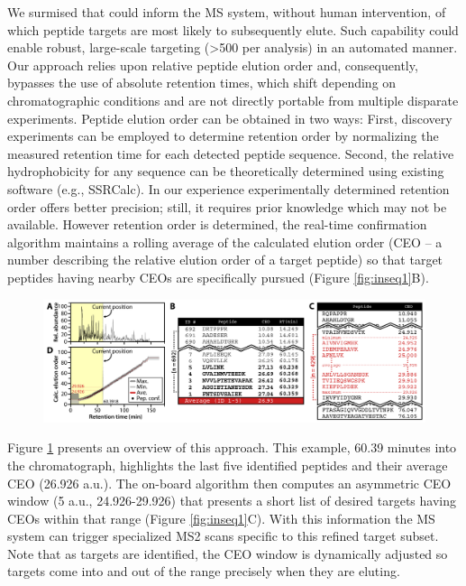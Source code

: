 We surmised that \inseq{} could inform the MS system, without human intervention, of which peptide targets are most likely to subsequently elute. Such capability could enable robust, large-scale targeting (>500 per analysis) in an automated manner. Our approach relies upon relative peptide elution order and, consequently, bypasses the use of absolute retention times, which shift depending on chromatographic conditions and are not directly portable from multiple disparate experiments. Peptide elution order can be obtained in two ways: First, discovery experiments can be employed to determine retention order by normalizing the measured retention time for each detected peptide sequence. Second, the relative hydrophobicity for any sequence can be theoretically determined using existing software (e.g., SSRCalc).\cite{ssrcalc1,ssrcalc2,incselect} In our experience experimentally determined retention order offers better precision; still, it requires prior knowledge which may not be available. However retention order is determined, the real-time confirmation algorithm maintains a rolling average of the calculated elution order (CEO -- a number describing the relative elution order of a target peptide) so that target peptides having nearby CEOs are specifically pursued (Figure \ref{fig:inseq1}B).
\begin{figure}
	\centering
	\includegraphics[width=\columnwidth]{inseq/inSeq_Fig 2.png}
	\label{fig:inseq2}
\end{figure}
Figure \ref{fig:inseq2} presents an overview of this approach. This example, 60.39 minutes into the chromatograph, highlights the last five \inseq{} identified peptides and their average CEO (26.926 a.u.). The on-board algorithm then computes an asymmetric CEO window (5 a.u., 24.926-29.926) that presents a short list of desired targets having CEOs within that range (Figure \ref{fig:inseq1}C). With this information the MS system can trigger specialized MS2 scans specific to this refined target subset. Note that as targets are identified, the CEO window is dynamically adjusted so targets come into and out of the range precisely when they are eluting.

